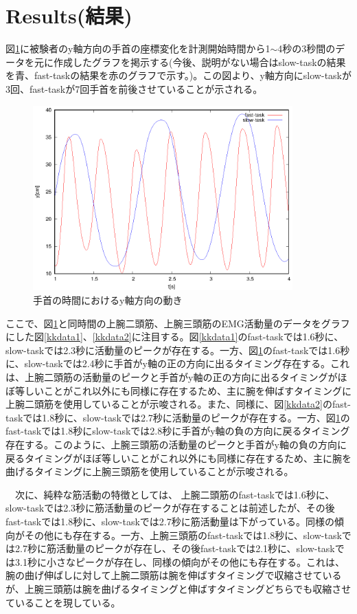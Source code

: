 \documentclass{jsarticle}
\begin{document}
\section{Results(結果)}
図\ref{tym3}に被験者のy軸方向の手首の座標変化を計測開始時間から1$\sim$4秒の3秒間のデータを元に作成したグラフを掲示する(今後、説明がない場合はslow-taskの結果を青、fast-taskの結果を赤のグラフで示す。)。この図より、y軸方向にslow-taskが3回、fast-taskが7回手首を前後させていることが示される。


\begin{figure}[htb]
\begin{center}
\includegraphics[width=10cm]{tym3.eps}
\caption{手首の時間におけるy軸方向の動き}
\label{tym3}
\end{center}
\end{figure}


ここで、図\ref{tym3}と同時間の上腕二頭筋、上腕三頭筋のEMG活動量のデータをグラフにした図\ref{kkdata1}、\ref{kkdata2}に注目する。図\ref{kkdata1}のfast-taskでは1.6秒に、slow-taskでは2.3秒に活動量のピークが存在する。一方、図\ref{tym3}のfast-taskでは1.6秒に、slow-taskでは2.4秒に手首がy軸の正の方向に出るタイミング存在する。これは、上腕二頭筋の活動量のピークと手首がy軸の正の方向に出るタイミングがほぼ等しいことがこれ以外にも同様に存在するため、主に腕を伸ばすタイミングに上腕二頭筋を使用していることが示唆される。また、同様に、図\ref{kkdata2}のfast-taskでは1.8秒に、slow-taskでは2.7秒に活動量のピークが存在する。一方、図\ref{tym3}のfast-taskでは1.8秒にslow-taskでは2.8秒に手首がy軸の負の方向に戻るタイミング存在する。このように、上腕三頭筋の活動量のピークと手首がy軸の負の方向に戻るタイミングがほぼ等しいことがこれ以外にも同様に存在するため、主に腕を曲げるタイミングに上腕三頭筋を使用していることが示唆される。

　次に、純粋な筋活動の特徴としては、
上腕二頭筋のfast-taskでは1.6秒に、slow-taskでは2.3秒に筋活動量のピークが存在することは前述したが、その後fast-taskでは1.8秒に、slow-taskでは2.7秒に筋活動量は下がっている。同様の傾向がその他にも存在する。一方、上腕三頭筋のfast-taskでは1.8秒に、slow-taskでは2.7秒に筋活動量のピークが存在し、その後fast-taskでは2.1秒に、slow-taskでは3.1秒に小さなピークが存在し、同様の傾向がその他にも存在する。これは、腕の曲げ伸ばしに対して上腕二頭筋は腕を伸ばすタイミングで収縮させているが、上腕三頭筋は腕を曲げるタイミングと伸ばすタイミングどちらでも収縮させていることを現している。
\end{document}
